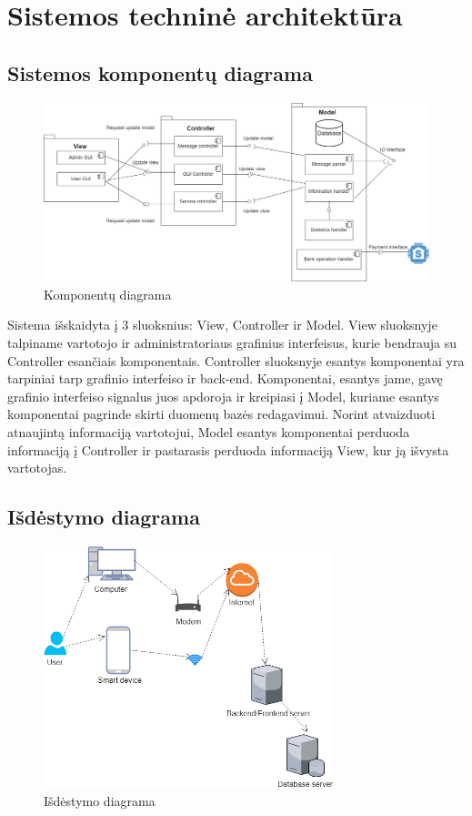 \documentclass[oneside]{VUMIFPSkursinis}
\begin{document}
\section{Sistemos techninė architektūra}
	\subsection{Sistemos komponentų diagrama}
			\begin{figure}[h]
    				\centering
    				\includegraphics[width=1\textwidth]{KomponentuDiagrama.png}
    				\caption{Komponentų diagrama}
    				\label{fig:Komponentų diagrama}
			\end{figure}

	Sistema išskaidyta į 3 sluoksnius: View, Controller ir Model. View sluoksnyje talpiname vartotojo ir administratoriaus grafinius interfeisus, kurie bendrauja su Controller esančiais komponentais. Controller sluoksnyje esantys komponentai yra tarpiniai tarp grafinio interfeiso ir back-end. Komponentai, esantys jame, gavę grafinio interfeiso signalus juos apdoroja ir kreipiasi į Model, kuriame esantys komponentai pagrinde skirti duomenų bazės redagavimui. Norint atvaizduoti atnaujintą informaciją vartotojui, Model esantys komponentai perduoda informaciją į Controller ir pastarasis perduoda informaciją View, kur ją išvysta vartotojas.
	\subsection{Išdėstymo diagrama}
			\begin{figure}[h]
    				\centering
    				\includegraphics[width=0.75\textwidth]{Deployment.png}
    				\caption{Išdėstymo diagrama}
			\end{figure}
\end{document}
